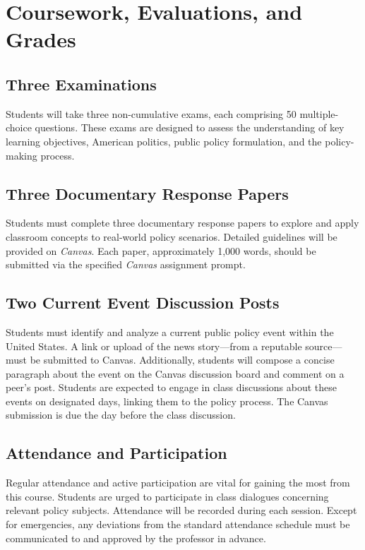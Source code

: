 \documentclass[12pt, letterpaper]{article}
\begin{document}
\section*{Coursework, Evaluations, and Grades}

\subsection*{Three Examinations}

	Students will take three non-cumulative exams, each comprising 50 multiple-choice questions. These exams are designed to assess the understanding of key learning objectives, American politics, public policy formulation, and the policy-making process.

\subsection*{Three Documentary Response Papers}

	Students must complete three documentary response papers to explore and apply classroom concepts to real-world policy scenarios. Detailed guidelines will be provided on \emph{Canvas}. Each paper, approximately 1,000 words, should be submitted via the specified \emph{Canvas} assignment prompt.

\subsection*{Two Current Event Discussion Posts}

	Students must identify and analyze a current public policy event within the United States. A link or upload of the news story---from a reputable source---must be submitted to Canvas. Additionally, students will compose a concise paragraph about the event on the Canvas discussion board and comment on a peer's post. Students are expected to engage in class discussions about these events on designated days, linking them to the policy process. The Canvas submission is due the day before the class discussion.

\subsection*{Attendance and Participation}

	Regular attendance and active participation are vital for gaining the most from this course. Students are urged to participate in class dialogues concerning relevant policy subjects. Attendance will be recorded during each session. Except for emergencies, any deviations from the standard attendance schedule must be communicated to and approved by the professor in advance.
\end{document}
